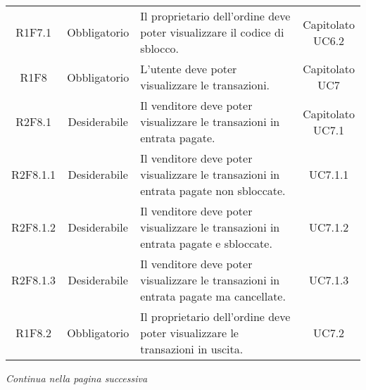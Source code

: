 \begin{table}[H]
\begin{tabular}{c | c | p{6cm} | c}
        R1F7.1                                                            & Obbligatorio & Il proprietario dell'ordine deve poter visualizzare il codice di sblocco.                                             & \Shortunderstack{Capitolato               \\UC6.2\\}   \\
        R1F8                                                              & Obbligatorio & L'utente deve poter visualizzare le transazioni.                                                                      & \Shortunderstack{Capitolato               \\UC7\\}   \\
        R2F8.1                                                            & Desiderabile & Il venditore deve poter visualizzare le transazioni in entrata pagate.                                                & \Shortunderstack{Capitolato               \\UC7.1\\} \\
        R2F8.1.1                                                          & Desiderabile & Il venditore deve poter visualizzare le transazioni in entrata pagate non sbloccate.                                  & UC7.1.1                                   \\
        R2F8.1.2                                                          & Desiderabile & Il venditore deve poter visualizzare le transazioni in entrata pagate e sbloccate.                                    & UC7.1.2                                   \\
        R2F8.1.3                                                          & Desiderabile & Il venditore deve poter visualizzare le transazioni in entrata pagate ma cancellate.                                  & UC7.1.3                                   \\
        R1F8.2                                                            & Obbligatorio & Il proprietario dell'ordine deve poter visualizzare le transazioni in uscita.                                         & UC7.2                                     \\
    \end{tabular}
\end{table}
\begin{center}
    \textit{\small Continua nella pagina successiva}
\end{center}
